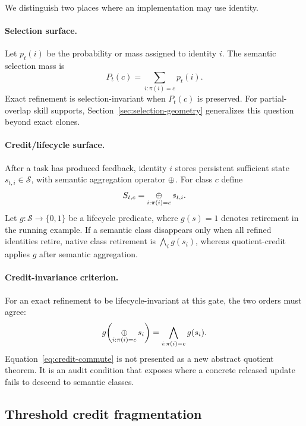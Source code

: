 We distinguish two places where an implementation may use identity.

\paragraph{Selection surface.}
Let $p_t(i)$ be the probability or mass assigned to identity $i$. The semantic selection mass is
\begin{equation}
P_t(c)=\sum_{i:\pi(i)=c}p_t(i).
\end{equation}
Exact refinement is selection-invariant when $P_t(c)$ is preserved. For partial-overlap skill supports, Section~\ref{sec:selection-geometry} generalizes this question beyond exact clones.

\paragraph{Credit/lifecycle surface.}
After a task has produced feedback, identity $i$ stores persistent sufficient state $s_{t,i}\in\mathcal{S}$, with semantic aggregation operator $\oplus$. For class $c$ define
\begin{equation}
S_{t,c}=\mathop{\oplus}_{i:\pi(i)=c}s_{t,i}.
\end{equation}
Let $g:\mathcal{S}\to\{0,1\}$ be a lifecycle predicate, where $g(s)=1$ denotes retirement in the running example. If a semantic class disappears only when all refined identities retire, native class retirement is $\bigwedge_i g(s_i)$, whereas quotient-credit applies $g$ after semantic aggregation.

\paragraph{Credit-invariance criterion.}
For an exact refinement to be lifecycle-invariant at this gate, the two orders must agree:
\begin{equation}
\label{eq:credit-commute}
g\!\left(\mathop{\oplus}_{i:\pi(i)=c}s_i\right)
=\bigwedge_{i:\pi(i)=c}g(s_i).
\end{equation}
Equation~\ref{eq:credit-commute} is not presented as a new abstract quotient theorem. It is an audit condition that exposes where a concrete released update fails to descend to semantic classes.

\subsection{Threshold credit fragmentation}

